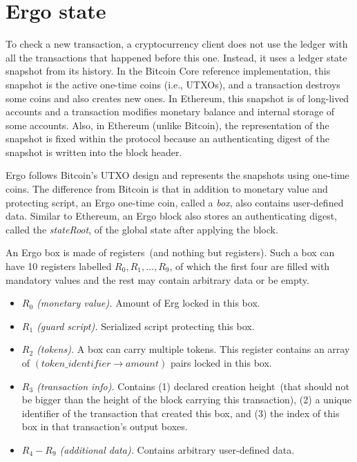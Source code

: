 \section{Ergo state}
\label{sec:utxo}

To check a new transaction, a cryptocurrency client does not use the ledger with all the transactions that happened before this
one. Instead, it uses a ledger state snapshot from its history. In the Bitcoin Core reference implementation, this snapshot is the active one-time coins (i.e., UTXOs), and a transaction destroys some coins and also creates new ones.
In Ethereum, this snapshot is of long-lived accounts and a transaction modifies monetary balance and internal storage of some accounts.  
Also, in Ethereum (unlike Bitcoin), the representation of the snapshot is fixed within the protocol because an authenticating digest of the snapshot is written into the block header. 

Ergo follows Bitcoin's UTXO design and represents the snapshots using one-time coins. The difference from Bitcoin is that in addition to monetary value and protecting script, an Ergo one-time coin, called a {\em box}, also contains user-defined data.
Similar to Ethereum, an Ergo block also stores an authenticating digest, called the {\em stateRoot}, of the global state after applying the block. 

An Ergo box is made of registers~(and nothing but registers). Such a box can have 10 registers labelled $R_0,R_1,\ldots,R_9$, of which the first four are filled with mandatory values and the rest may contain arbitrary data or be empty. 


\begin{itemize}
    \item{\em $R_0$ (monetary value). } Amount of Erg locked in this box.
    \item{\em $R_1$ (guard script). } Serialized script protecting this box.
    \item{\em $R_2$ (tokens). } A box can carry multiple tokens. This register contains an array of
    $(token\_identifier \rightarrow amount)$ pairs locked in this box.
    \item{\em $R_3$ (transaction info). } Contains (1) declared creation height~(that should not be bigger than the height of the block carrying this transaction), 
    (2) a unique identifier of the transaction that created this box, and (3) the index of this box in that transaction's output boxes. 
    \item{\em $R_4-R_9$ (additional data). } Contains arbitrary user-defined data.
\end{itemize}

